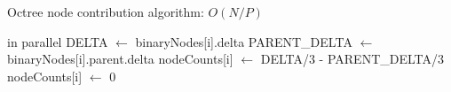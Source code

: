\documentclass{thesis}
\begin{document}
\begin{algorithm}
    \label{alg:NodeContributions}
    \caption{Octree node contribution algorithm: $O(N/P)$}
    \begin{algorithmic}
         in parallel
                \State DELTA $\gets$ binaryNodes[i].delta
                \State PARENT\_DELTA $\gets$ binaryNodes[i].parent.delta
                \State nodeCounts[i] $\gets$ DELTA/3 - PARENT\_DELTA/3
            \Else
                \State nodeCounts[i] $\gets$ 0
            \EndIf
        \EndFor
    \end{algorithmic}
\end{algorithm}



\end{document}
